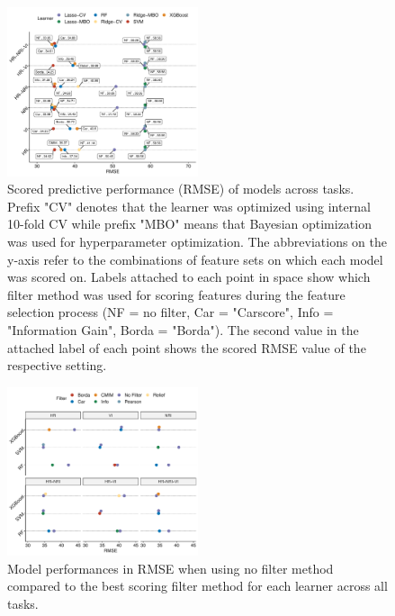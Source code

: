 \documentclass[letterpaper, journal]{IEEEtran}
\begin{document}
\begin{figure} [t!]
\centering
	\begin{center}
		\includegraphics[width=0.5\textwidth] {performance-results-1.pdf}
        \caption{Scored predictive performance (RMSE) of models across tasks. Prefix "CV" denotes that the learner was optimized using internal 10-fold CV while prefix "MBO" means that Bayesian optimization was used for hyperparameter optimization. The abbreviations on the y-axis refer to the combinations of feature sets on which each model was scored on. Labels attached to each point in space show which filter method was used for scoring features during the feature selection process (NF = no filter, Car = "Carscore", Info = "Information Gain", Borda = "Borda"). The second value in the attached label of each point shows the scored RMSE value of the respective setting.}
		\label{fig:perf-result}
	\end{center}
\end{figure}

\begin{figure} [t!]
\centering
	\begin{center}
		\includegraphics[width=0.5\textwidth] {filter-effect-1.pdf}
        \caption{Model performances in RMSE when using no filter method compared to the best scoring filter method for each learner across all tasks.}
		\label{fig:filter-effects}
	\end{center}
\end{figure}
\end{document}

